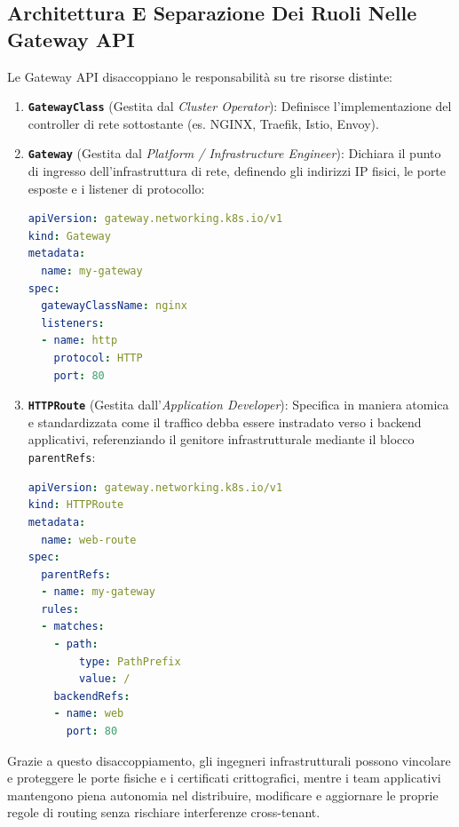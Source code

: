 \documentclass[11pt, a4paper]{article}
\begin{document}
\subsection{Architettura E Separazione Dei Ruoli Nelle Gateway API}
Le Gateway API disaccoppiano le responsabilità su tre risorse distinte:
\begin{enumerate}
    \item \textbf{\texttt{GatewayClass}} (Gestita dal \emph{Cluster Operator}): Definisce l'implementazione del controller di rete sottostante (es. NGINX, Traefik, Istio, Envoy).
    \item \textbf{\texttt{Gateway}} (Gestita dal \emph{Platform / Infrastructure Engineer}): Dichiara il punto di ingresso dell'infrastruttura di rete, definendo gli indirizzi IP fisici, le porte esposte e i listener di protocollo:
\begin{lstlisting}[language=yaml, caption={Definizione del punto di ingresso Gateway}]
apiVersion: gateway.networking.k8s.io/v1
kind: Gateway
metadata:
  name: my-gateway
spec:
  gatewayClassName: nginx
  listeners:
  - name: http
    protocol: HTTP
    port: 80
\end{lstlisting}
    \item \textbf{\texttt{HTTPRoute}} (Gestita dall'\emph{Application Developer}): Specifica in maniera atomica e standardizzata come il traffico debba essere instradato verso i backend applicativi, referenziando il genitore infrastrutturale mediante il blocco \texttt{parentRefs}:
\begin{lstlisting}[language=yaml, caption={Definizione delle regole di routing con HTTPRoute}]
apiVersion: gateway.networking.k8s.io/v1
kind: HTTPRoute
metadata:
  name: web-route
spec:
  parentRefs:
  - name: my-gateway
  rules:
  - matches:
    - path:
        type: PathPrefix
        value: /
    backendRefs:
    - name: web
      port: 80
\end{lstlisting}
\end{enumerate}

Grazie a questo disaccoppiamento, gli ingegneri infrastrutturali possono vincolare e proteggere le porte fisiche e i certificati crittografici, mentre i team applicativi mantengono piena autonomia nel distribuire, modificare e aggiornare le proprie regole di routing senza rischiare interferenze cross-tenant.

\newpage

\end{document}
